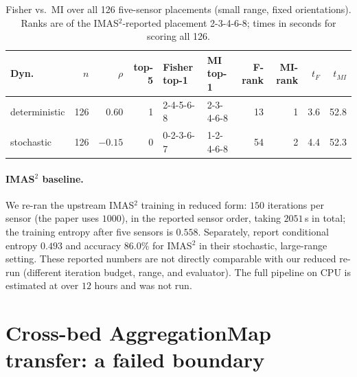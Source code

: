 \documentclass[11pt,a4paper]{article}
\begin{document}
\begin{table}[t]
\centering
\footnotesize
\caption{Fisher vs.\ MI over all 126 five-sensor placements (small range, fixed orientations). Ranks are of the IMAS$^2$-reported placement 2-3-4-6-8; times in seconds for scoring all 126.}
\label{tab:imas2-place}
\begin{tabular}{lrrrllrrrr}
\toprule
Dyn. & $n$ & $\rho$ & top-5 & Fisher top-1 & MI top-1 & F-rank & MI-rank & $t_F$ & $t_{MI}$ \\
\midrule
deterministic & 126 & $0.60$ & 1 & 2-4-5-6-8 & 2-3-4-6-8 & 13 & 1 & 3.6 & 52.8 \\
stochastic & 126 & $-0.15$ & 0 & 0-2-3-6-7 & 1-2-4-6-8 & 54 & 2 & 4.4 & 52.3 \\
\bottomrule
\end{tabular}
\end{table}

\paragraph{IMAS$^2$ baseline.}
We re-ran the upstream IMAS$^2$ training in reduced form: $150$ iterations per
sensor (the paper uses $1000$), in the reported sensor order, taking
$2051$\,s in total; the training entropy after five sensors is
$0.558$. Separately, \citet{shi2026imas2} report conditional entropy
$0.493$ and accuracy $86.0\%$ for IMAS$^2$ in their stochastic, large-range
setting. These reported numbers are not directly comparable with our reduced
re-run (different iteration budget, range, and evaluator). The full pipeline
on CPU is estimated at over $12$ hours and was not run.

\section{Cross-bed AggregationMap transfer: a failed boundary}
\label{sec:cross-bed}
\end{document}
